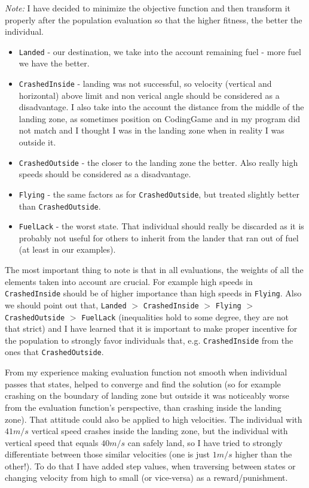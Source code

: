 \documentclass[11pt]{article}
\begin{document}
	\textit{Note:} I have decided to minimize the objective function and then transform it properly after the population evaluation so that the higher fitness, the better the individual.
		
	\begin{itemize}
		\item \texttt{Landed} - our destination, we take into the account remaining fuel - more fuel we have the better.
		\item \texttt{CrashedInside} - landing was not successful, so velocity (vertical and horizontal) above limit and non verical angle should be considered as a disadvantage. I also take into the account the distance from the middle of the landing zone, as sometimes position on CodingGame and in my program did not match and I thought I was in the landing zone when in reality I was outside it.
		\item \texttt{CrashedOutside} - the closer to the landing zone the better. Also really high speeds should be considered as a disadvantage.
		\item \texttt{Flying} - the same factors as for \texttt{CrashedOutside}, but treated slightly better than \texttt{CrashedOutside}.
		\item \texttt{FuelLack} - the worst state. That individual should really be discarded as it is probably not useful for others to inherit from the lander that ran out of fuel (at least in our examples).
	\end{itemize}
	
	The most important thing to note is that in all evaluations, the weights of all the elements taken into account are crucial. For example high speeds in \texttt{CrashedInside} should be of higher importance than high speeds in \texttt{Flying}. Also we should point out that, \texttt{Landed} $>$ \texttt{CrashedInside} $>$ \texttt{Flying} $>$ \texttt{CrashedOutside} $>$ \texttt{FuelLack} (inequalities hold to some degree, they are not that strict) and I have learned that it is important to make proper incentive for the population to strongly favor individuals that, e.g. \texttt{CrashedInside} from the ones that \texttt{CrashedOutside}. 
	
	From my experience making evaluation function not smooth when individual passes that states, helped to converge and find the solution (so for example crashing on the boundary of landing zone but outside it was noticeably worse from the evaluation function's perspective, than crashing inside the landing zone). That attitude could also be applied to high velocities. The individual with $41m/s$ vertical speed crashes inside the landing zone, but the individual with vertical speed that equals $40m/s$ can safely land, so I have tried to strongly differentiate between those similar velocities (one is just $1m/s$ higher than the other!). To do that I have added step values, when traversing between states or changing velocity from high to small (or vice-versa) as a reward/punishment.
	
\end{document}
